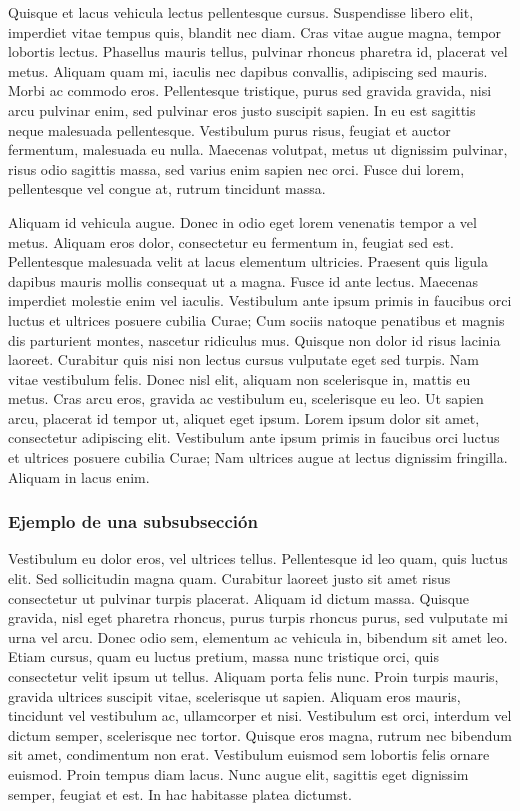 \documentclass[11pt, a4paper]{report}
\begin{document}
Quisque et lacus vehicula lectus pellentesque cursus. Suspendisse libero elit, imperdiet vitae tempus quis, blandit nec diam. Cras vitae augue magna, tempor lobortis lectus. Phasellus mauris tellus, pulvinar rhoncus pharetra id, placerat vel metus. Aliquam quam mi, iaculis nec dapibus convallis, adipiscing sed mauris. Morbi ac commodo eros. Pellentesque tristique, purus sed gravida gravida, nisi arcu pulvinar enim, sed pulvinar eros justo suscipit sapien. In eu est sagittis neque malesuada pellentesque. Vestibulum purus risus, feugiat et auctor fermentum, malesuada eu nulla. Maecenas volutpat, metus ut dignissim pulvinar, risus odio sagittis massa, sed varius enim sapien nec orci. Fusce dui lorem, pellentesque vel congue at, rutrum tincidunt massa.

Aliquam id vehicula augue. Donec in odio eget lorem venenatis tempor a vel metus. Aliquam eros dolor, consectetur eu fermentum in, feugiat sed est. Pellentesque malesuada velit at lacus elementum ultricies. Praesent quis ligula dapibus mauris mollis consequat ut a magna. Fusce id ante lectus. Maecenas imperdiet molestie enim vel iaculis. Vestibulum ante ipsum primis in faucibus orci luctus et ultrices posuere cubilia Curae; Cum sociis natoque penatibus et magnis dis parturient montes, nascetur ridiculus mus. Quisque non dolor id risus lacinia laoreet. Curabitur quis nisi non lectus cursus vulputate eget sed turpis. Nam vitae vestibulum felis. Donec nisl elit, aliquam non scelerisque in, mattis eu metus. Cras arcu eros, gravida ac vestibulum eu, scelerisque eu leo. Ut sapien arcu, placerat id tempor ut, aliquet eget ipsum. Lorem ipsum dolor sit amet, consectetur adipiscing elit. Vestibulum ante ipsum primis in faucibus orci luctus et ultrices posuere cubilia Curae; Nam ultrices augue at lectus dignissim fringilla. Aliquam in lacus enim.





\subsubsection{Ejemplo de una subsubsección}

Vestibulum eu dolor eros, vel ultrices tellus. Pellentesque id leo quam, quis luctus elit. Sed sollicitudin magna quam. Curabitur laoreet justo sit amet risus consectetur ut pulvinar turpis placerat. Aliquam id dictum massa. Quisque gravida, nisl eget pharetra rhoncus, purus turpis rhoncus purus, sed vulputate mi urna vel arcu. Donec odio sem, elementum ac vehicula in, bibendum sit amet leo. Etiam cursus, quam eu luctus pretium, massa nunc tristique orci, quis consectetur velit ipsum ut tellus. Aliquam porta felis nunc. Proin turpis mauris, gravida ultrices suscipit vitae, scelerisque ut sapien. Aliquam eros mauris, tincidunt vel vestibulum ac, ullamcorper et nisi. Vestibulum est orci, interdum vel dictum semper, scelerisque nec tortor. Quisque eros magna, rutrum nec bibendum sit amet, condimentum non erat. Vestibulum euismod sem lobortis felis ornare euismod. Proin tempus diam lacus. Nunc augue elit, sagittis eget dignissim semper, feugiat et est. In hac habitasse platea dictumst.
\end{document}

